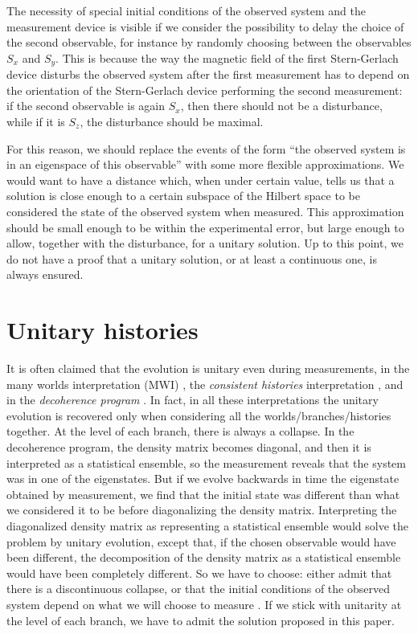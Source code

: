 \documentclass[11pt]{amsart}
\theoremstyle{definition}
\theoremstyle{plain}
\begin{document}
The necessity of special initial conditions of the observed system and the measurement device is visible if we consider the possibility to delay the choice of the second observable, for instance by randomly choosing between the observables $S_x$ and $S_y$. This is because the way the magnetic field of the first Stern-Gerlach device disturbs the observed system after the first measurement has to depend on the orientation of the Stern-Gerlach device performing the second measurement: if the second observable is again $S_x$, then there should not be a disturbance, while if it is $S_z$, the disturbance should be maximal.

For this reason, we should replace the events of the form ``the observed system is in an eigenspace of this observable'' with some more flexible approximations. We would want to have a distance which, when under certain value, tells us that a solution is close enough to a certain subspace of the Hilbert space to be considered the state of the observed system when measured. This approximation should be small enough to be within the experimental error, but large enough to allow, together with the disturbance, for a unitary solution. Up to this point, we do not have a proof that a unitary solution, or at least a continuous one, is always ensured.


\section{Unitary histories}

It is often claimed that the evolution is unitary even during measurements, in the many worlds interpretation (MWI) \cite{Eve57,dWEG73,Vaidman2002MWI}, the \textit{consistent histories} interpretation \cite{Gri84,GH90a,Omn92}, and in the \textit{decoherence program} \cite{Zeh96,Zur98,Zur03a}. In fact, in all these interpretations the unitary evolution is recovered only when considering all the worlds/branches/histories together. At the level of each branch, there is always a collapse. In the decoherence program, the density matrix becomes diagonal, and then it is interpreted as a statistical ensemble, so the measurement reveals that the system was in one of the eigenstates. But if we evolve backwards in time the eigenstate obtained by measurement, we find that the initial state was different than what we considered it to be before diagonalizing the density matrix. Interpreting the diagonalized density matrix as representing a statistical ensemble would solve the problem by unitary evolution, except that, if the chosen observable would have been different, the decomposition of the density matrix as a statistical ensemble would have been completely different. So we have to choose: either admit that there is a discontinuous collapse, or that the initial conditions of the observed system depend on what we will choose to measure \cite{Sto12QMb}. If we stick with unitarity at the level of each branch, we have to admit the solution proposed in this paper.
\end{document}
